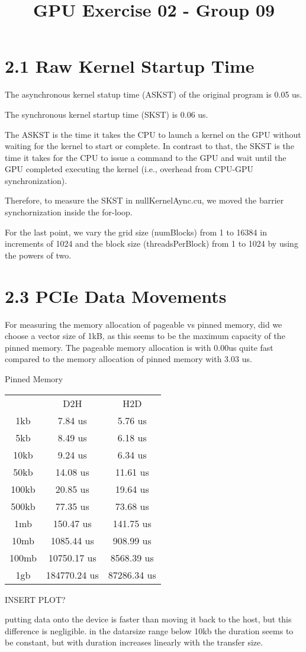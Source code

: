 \documentclass{report}
\begin{document}
\title{GPU Exercise 02 - Group 09}
\maketitle


\section*{2.1 Raw Kernel Startup Time}

The asynchronous kernel statup time (ASKST) of the original program is 0.05 us.

The synchronous kernel startup time (SKST) is 0.06 us.

The ASKST is the time it takes the CPU to launch a kernel on the GPU without waiting for the
kernel to start or complete. In contrast to that, the SKST is the time it takes for the CPU to issue a command to the GPU and wait until the GPU
completed executing the kernel (i.e., overhead from CPU-GPU synchronization).

Therefore, to measure the SKST in nullKernelAync.cu, we moved the barrier synchornization inside the for-loop.

For the last point, we vary the grid size (numBlocks) from 1 to 16384 in increments of 1024 and the block size (threadsPerBlock) from 1 to 1024 by using the powers of two.





\section*{2.3 PCIe Data Movements}
For measuring the memory allocation of pageable vs pinned memory, did we choose a vector size of 1kB, as this seems to be the maximum capacity of the pinned memory.
The pageable memory allocation is with 0.00us quite fast compared to the memory allocation of pinned memory with 3.03 us.



Pinned Memory
\begin{center}
    \begin{tabular}{ c c c }
        & D2H & H2D \\ 
     1kb & 7.84 us & 5.76 us \\ 
     5kb & 8.49 us & 6.18 us \\  
     10kb &  9.24  us & 6.34 us \\ 
     50kb & 14.08 us & 11.61 us \\  
     100kb &  20.85   us & 19.64 us \\ 
     500kb & 77.35  us &  73.68 us \\    
     1mb &150.47 us & 141.75 us \\ 
     10mb & 1085.44 us &  908.99 us \\ 
     100mb &  10750.17   us & 8568.39 us \\ 
     1gb & 184770.24 us &  87286.34 us \\ 
    \end{tabular}
    \end{center}

    INSERT PLOT?

    putting data onto the device is faster than moving it back to the host, but this difference is negligible. 
    in the datarsize range below 10kb the duration seems to be constant, but with duration increases linearly with the transfer size.
\end{document}
